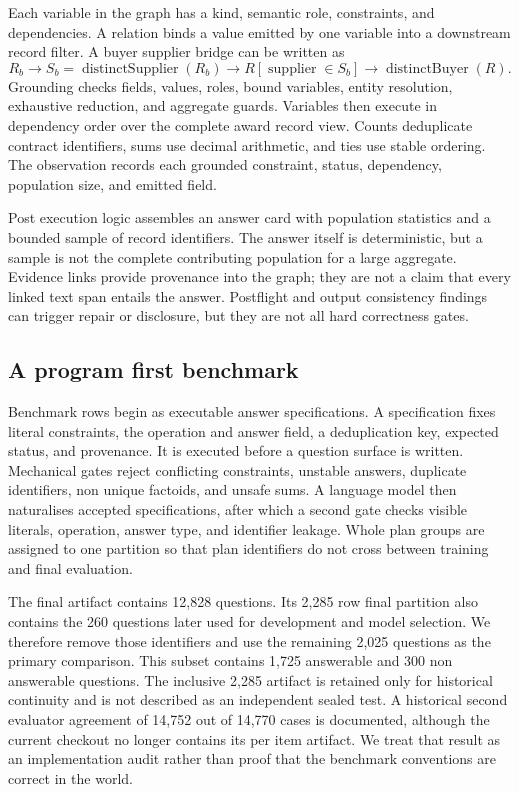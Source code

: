 \documentclass{article}
\begin{document}
Each variable in the graph has a kind, semantic role, constraints, and dependencies.  A relation
binds a value emitted by one variable into a downstream record filter.  A buyer supplier bridge can
be written as
\begin{equation}
 R_b \longrightarrow S_b=\operatorname{distinctSupplier}(R_b)
 \longrightarrow R[\operatorname{supplier}\in S_b]
 \longrightarrow \operatorname{distinctBuyer}(R).
 \label{eq:bridge}
\end{equation}
Grounding checks fields, values, roles, bound variables, entity resolution, exhaustive reduction,
and aggregate guards.  Variables then execute in dependency order over the complete award record
view.  Counts deduplicate contract identifiers, sums use decimal arithmetic, and ties use stable
ordering.  The observation records each grounded constraint, status, dependency, population size,
and emitted field.

Post execution logic assembles an answer card with population statistics and a bounded sample of
record identifiers.  The answer itself is deterministic, but a sample is not the complete
contributing population for a large aggregate.  Evidence links provide provenance into the graph;
they are not a claim that every linked text span entails the answer.  Postflight and output
consistency findings can trigger repair or disclosure, but they are not all hard correctness gates.

\subsection{A program first benchmark}

Benchmark rows begin as executable answer specifications.  A specification fixes literal
constraints, the operation and answer field, a deduplication key, expected status, and provenance.
It is executed before a question surface is written.  Mechanical gates reject conflicting
constraints, unstable answers, duplicate identifiers, non unique factoids, and unsafe sums.  A
language model then naturalises accepted specifications, after which a second gate checks visible
literals, operation, answer type, and identifier leakage.  Whole plan groups are assigned to one
partition so that plan identifiers do not cross between training and final evaluation.

The final artifact contains 12,828 questions.  Its 2,285 row final partition also contains the 260
questions later used for development and model selection.  We therefore remove those identifiers
and use the remaining 2,025 questions as the primary comparison.  This subset contains 1,725
answerable and 300 non answerable questions.  The inclusive 2,285 artifact is retained only for
historical continuity and is not described as an independent sealed test.  A historical second
evaluator agreement of 14,752 out of 14,770 cases is documented, although the current checkout no
longer contains its per item artifact.  We treat that result as an implementation audit rather
than proof that the benchmark conventions are correct in the world.
\end{document}
